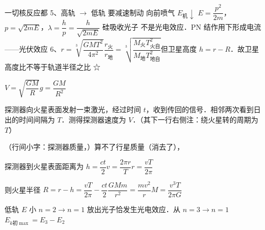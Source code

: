 一切核反应都\quad {}
5、高轨 $\to$ 低轨 要减速制动 向前喷气 $E_{\text{机}}\downarrow$%
$E=\dfrac{p^2}{2m}$，\quad $p=\sqrt{2mE}$，\quad $\lambda=\dfrac hp=\dfrac{h}{\sqrt{2mE}}$
硅吸收光子 不是光电效应．PN 结作用下形成电流——光伏效应%
6、$r=\sqrt[3]{\dfrac{GMT^2}{4\pi^2}}$\quad $\dfrac{r_{\text{火}}}{r_{\text{地}}}=\sqrt[3]{\dfrac{M_{\text{火}}T_{\text{火自}}^{2}}{M_{\text{地}}T_{\text{地自}}^{2}}}$\quad 但卫星高度 $h=r-R$．故卫星高度比不等于轨道半径之比 ☆%

$V=\sqrt{\dfrac{GM}{R}}$\quad\quad $g=\dfrac{GM}{R^2}$
\begin{problem}[7]
探测器向火星表面发射一束激光，经过时间 $t$，收到传回的信号．相邻两次看到日出的时间间隔为 $T$．测得探测器速度为 $V$．（其下一行右侧注：绕火星转的周期为 $T$）%
\begin{solution}
（行间小字：探测器质量，）算不了行星质量（消去了），%

探测器到火星表面距离为 $h=\dfrac{ct}{2}$\quad $v=\dfrac{2\pi r}{T}$\quad $r=\dfrac{vT}{2\pi}$

则火星半径 $R=r-h=\dfrac{vT}{2\pi}-\dfrac{ct}{2}$\quad $\dfrac{GMm}{r^2}=\dfrac{mv^2}{r}$\quad $M=\dfrac{v^3T}{2\pi G}$%
\end{solution}
\end{problem}
\quad 低轨 $E$ 小
$n=2\to n=1$ 放出光子恰发生光电效应．从 $n=3\to n=1$\quad $E_{k\text{初}\max}=E_3-E_2$

